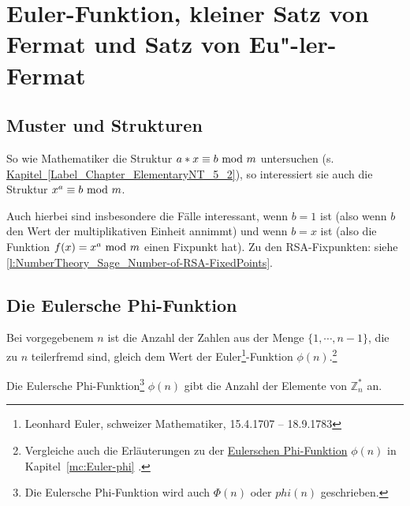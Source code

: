 \begin{refsegment}
\hypertarget{Chapter_ElementaryNT_8}{}
\section[Euler-Funktion, kleiner Satz von Fermat und Satz von Euler-Fermat]
        {Euler-Funktion, kleiner Satz von Fermat und Satz von Eu"-ler-Fermat}

\hypertarget{patternsandstructures}{}
\subsection{Muster und Strukturen}
\label{patternsandstructures}
So wie Mathematiker die Struktur $a*x \equiv b {\rm ~mod~}m $ untersuchen
(s. \hyperlink{Chapter_ElementaryNT_5_2}
{Kapitel~\ref{Label_Chapter_ElementaryNT_5_2}}),
so interessiert sie auch die Struktur $ x^{a}\equiv b {\rm ~mod~}m$.

Auch hierbei sind insbesondere die Fälle interessant, wenn $b=1$ ist
(also wenn $b$ den Wert der multiplikativen Einheit annimmt) und wenn $b=x$ ist
(also die Funktion $ f(x) = x^{a} {\rm ~mod~} m$ einen Fixpunkt hat).
Zu den RSA-Fixpunkten: siehe \ref{l:NumberTheory_Sage_Number-of-RSA-FixedPoints}.


\subsection{Die Eulersche Phi-Funktion}
\label{L-Euler-Function}

Bei vorgegebenem $n$ ist die Anzahl der Zahlen aus der Menge $\{1, \cdots,
n-1\}$, die zu $n$ teilerfremd sind,
gleich dem Wert der Euler\footnote{%
  Leonhard Euler, schweizer Mathematiker, 15.4.1707 -- 18.9.1783
}-Funktion $\phi(n)$.\footnote{%
  Vergleiche auch die Erläuterungen zu der \hyperlink{mc:Euler-phi}{Eulerschen Phi-Funktion}
  $\phi(n)$ in Kapitel~\ref{mc:Euler-phi} \glqq {}\grqq.
}

\begin{definition}\label{def-zth-phiofn} \hypertarget{EulerFunction}{}
  Die Eulersche Phi-Funktion\footnote{%
    Die Eulersche Phi-Funktion wird auch
    $\Phi(n)$ oder $phi(n)$ geschrieben.
  }
  $\phi(n)$ gibt die Anzahl der Elemente von $\mathbb{Z}_n^*$ an.
\end{definition}


\end{refsegment}
